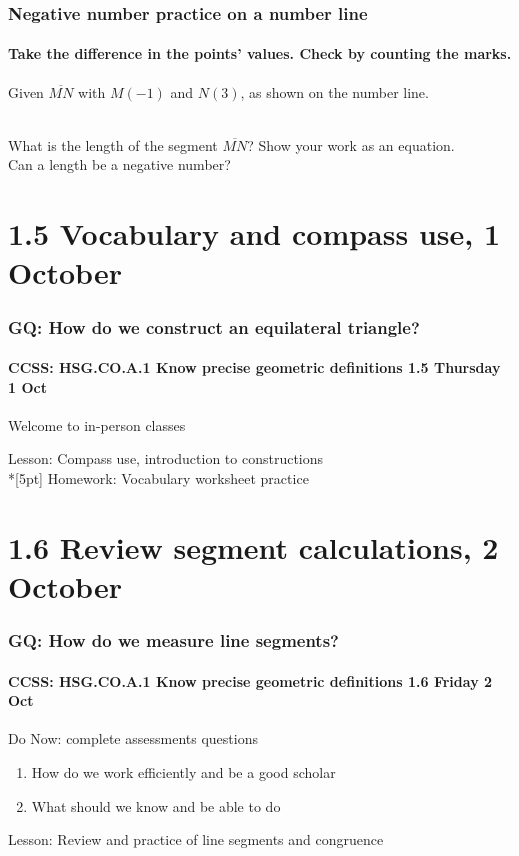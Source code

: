 \documentclass{beamer}
\begin{document}
  \frame
  {
    \frametitle{Negative number practice on a number line}
    \framesubtitle{Take the difference in the points' values. Check by counting the marks.}
    Given $\overline{MN}$ with $M(-1)$ and $N(3)$, as shown on the number line. \\[0.25cm]
       \\ \bigskip
  What is the length of the segment $\overline{MN}$? Show your work as an equation.\\[1.5cm]
  Can a length be a negative number? \vspace{2cm}  
  }

  \section{1.5 Vocabulary and compass use, 1 October}
  \frame
  {
    \frametitle{GQ: How do we construct an equilateral triangle?}
    \framesubtitle{CCSS: HSG.CO.A.1 Know precise geometric definitions  \hfill \alert{1.5 Thursday 1 Oct}}
  
    \begin{block}{Welcome to in-person classes}
    \end{block}
    Lesson: Compass use, introduction to constructions \\*[5pt]
    Homework: Vocabulary worksheet practice 
  }

  \section{1.6 Review segment calculations, 2 October}
  \frame
  {
    \frametitle{GQ: How do we measure line segments?}
    \framesubtitle{CCSS: HSG.CO.A.1 Know precise geometric definitions  \hfill \alert{1.6 Friday 2 Oct}}
  
    \begin{block}{Do Now: complete assessments questions}
    \begin{enumerate}
        \item How do we work efficiently and be a good scholar
        \item What should we know and be able to do
    \end{enumerate}
    \end{block}
    Lesson: Review and practice of line segments and congruence %
  }
\end{document}

